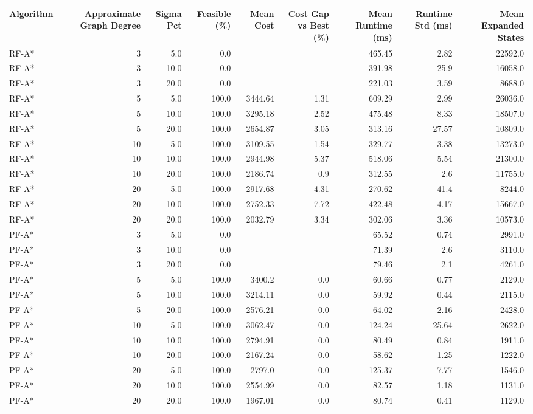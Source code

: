 \begin{tabular}{lrrrrrrrr}
\hline
Algorithm & Approximate Graph Degree & Sigma Pct & Feasible (\%) & Mean Cost & Cost Gap vs Best (\%) & Mean Runtime (ms) & Runtime Std (ms) & Mean Expanded States \\
\hline
RF-A* & 3 & 5.0 & 0.0 &  &  & 465.45 & 2.82 & 22592.0 \\
RF-A* & 3 & 10.0 & 0.0 &  &  & 391.98 & 25.9 & 16058.0 \\
RF-A* & 3 & 20.0 & 0.0 &  &  & 221.03 & 3.59 & 8688.0 \\
RF-A* & 5 & 5.0 & 100.0 & 3444.64 & 1.31 & 609.29 & 2.99 & 26036.0 \\
RF-A* & 5 & 10.0 & 100.0 & 3295.18 & 2.52 & 475.48 & 8.33 & 18507.0 \\
RF-A* & 5 & 20.0 & 100.0 & 2654.87 & 3.05 & 313.16 & 27.57 & 10809.0 \\
RF-A* & 10 & 5.0 & 100.0 & 3109.55 & 1.54 & 329.77 & 3.38 & 13273.0 \\
RF-A* & 10 & 10.0 & 100.0 & 2944.98 & 5.37 & 518.06 & 5.54 & 21300.0 \\
RF-A* & 10 & 20.0 & 100.0 & 2186.74 & 0.9 & 312.55 & 2.6 & 11755.0 \\
RF-A* & 20 & 5.0 & 100.0 & 2917.68 & 4.31 & 270.62 & 41.4 & 8244.0 \\
RF-A* & 20 & 10.0 & 100.0 & 2752.33 & 7.72 & 422.48 & 4.17 & 15667.0 \\
RF-A* & 20 & 20.0 & 100.0 & 2032.79 & 3.34 & 302.06 & 3.36 & 10573.0 \\
PF-A* & 3 & 5.0 & 0.0 &  &  & 65.52 & 0.74 & 2991.0 \\
PF-A* & 3 & 10.0 & 0.0 &  &  & 71.39 & 2.6 & 3110.0 \\
PF-A* & 3 & 20.0 & 0.0 &  &  & 79.46 & 2.1 & 4261.0 \\
PF-A* & 5 & 5.0 & 100.0 & 3400.2 & 0.0 & 60.66 & 0.77 & 2129.0 \\
PF-A* & 5 & 10.0 & 100.0 & 3214.11 & 0.0 & 59.92 & 0.44 & 2115.0 \\
PF-A* & 5 & 20.0 & 100.0 & 2576.21 & 0.0 & 64.02 & 2.16 & 2428.0 \\
PF-A* & 10 & 5.0 & 100.0 & 3062.47 & 0.0 & 124.24 & 25.64 & 2622.0 \\
PF-A* & 10 & 10.0 & 100.0 & 2794.91 & 0.0 & 80.49 & 0.84 & 1911.0 \\
PF-A* & 10 & 20.0 & 100.0 & 2167.24 & 0.0 & 58.62 & 1.25 & 1222.0 \\
PF-A* & 20 & 5.0 & 100.0 & 2797.0 & 0.0 & 125.37 & 7.77 & 1546.0 \\
PF-A* & 20 & 10.0 & 100.0 & 2554.99 & 0.0 & 82.57 & 1.18 & 1131.0 \\
PF-A* & 20 & 20.0 & 100.0 & 1967.01 & 0.0 & 80.74 & 0.41 & 1129.0 \\
\hline
\end{tabular}
